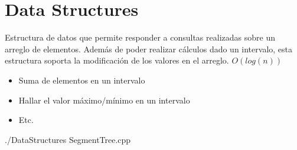 \section{Data Structures}
		\begin{multicols*}{2}
			{Estructura de datos que permite responder a consultas realizadas sobre un arreglo de elementos. Además de poder realizar cálculos dado un intervalo, esta estructura soporta la modificación de los valores en el arreglo.}
			{$O(log(n))$}
			{
				\begin{itemize}
					\item Suma de elementos en un intervalo
					\item Hallar el valor máximo/mínimo en un intervalo
					\item Etc.	
				\end{itemize}
			}
			{./DataStructures}
			{SegmentTree.cpp}
			
		\end{multicols*}